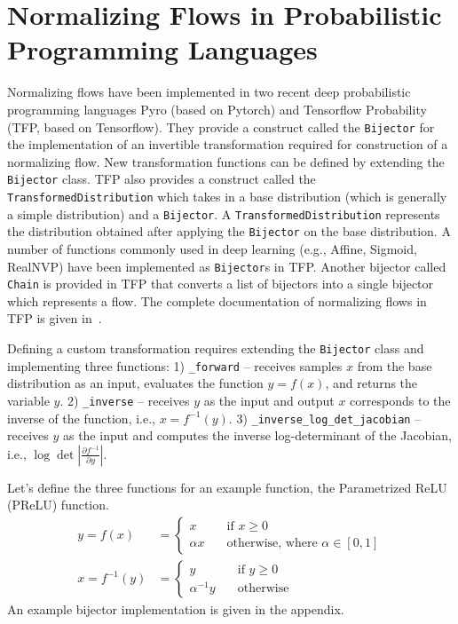 \documentclass[runningheads]{llncs}
\begin{document}
\section{Normalizing Flows in Probabilistic Programming Languages}
Normalizing flows have been implemented in two recent deep probabilistic programming languages Pyro (based on Pytorch) and Tensorflow Probability (TFP, based on Tensorflow). They provide a construct called the \texttt{Bijector} for the implementation of an invertible transformation required for construction of a normalizing flow. New transformation functions can be defined by extending the \texttt{Bijector} class. TFP also provides a construct called the \texttt{TransformedDistribution} which takes in a base distribution (which is generally a simple distribution) and a \texttt{Bijector}. A \texttt{TransformedDistribution} represents the distribution obtained after applying the \texttt{Bijector} on the base distribution. A number of functions commonly used in deep learning (e.g., Affine, Sigmoid, RealNVP) have been implemented as \texttt{Bijector}s in TFP. Another bijector called \texttt{Chain} is provided in TFP that converts a list of bijectors into a single bijector which represents a flow. The complete documentation of normalizing flows in TFP is given in~\cite{dillon2017tensorflow}.

Defining a custom transformation requires extending the \texttt{Bijector} class and implementing three functions: 1) \texttt{\_forward} -- receives samples $x$ from the base distribution as an input, evaluates the function $y = f(x)$, and returns the variable $y$. 2) \texttt{\_inverse} -- receives $y$ as the input and output $x$ corresponds to the inverse of the function, i.e., $x = f^{-1}(y)$. 3) \texttt{\_inverse\_log\_det\_jacobian} -- receives $y$ as the input and computes the inverse log-determinant of the Jacobian, i.e., $\log \det \left|\frac{\partial f^{-1}}{\partial y}\right|$. 

Let's define the three functions for an example function, the Parametrized ReLU (PReLU) function.
\begin{align}
y = f(x) &= \begin{cases}
x\quad&\text{if } x \geq 0\\
\alpha x\quad&\text{otherwise, where }\alpha\in [0, 1]
\end{cases}\\
x = f^{-1}(y) &= \begin{cases}
y\quad&\text{if } y \geq 0\\
\alpha^{-1} y\quad&\text{otherwise}
\end{cases}
\end{align}
An example bijector implementation is given in the appendix.
\end{document}
